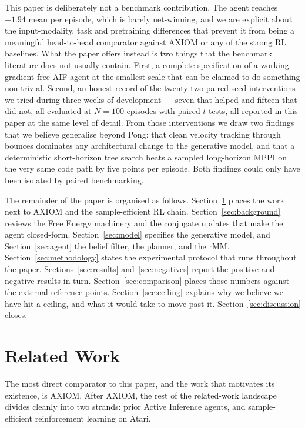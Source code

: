 \documentclass[runningheads]{llncs}
\begin{document}
This paper is deliberately not a benchmark contribution. The agent
reaches $+1.94$ mean per episode, which is barely net-winning, and
we are explicit about the input-modality, task and pretraining
differences that prevent it from being a meaningful head-to-head
comparator against AXIOM or any of the strong RL baselines. What
the paper offers instead is two things that the benchmark
literature does not usually contain. First, a complete
specification of a working gradient-free AIF agent at the smallest
scale that can be claimed to do something non-trivial. Second, an
honest record of the twenty-two paired-seed interventions we tried
during three weeks of development --- seven that helped and fifteen
that did not, all evaluated at $N{=}100$ episodes with paired
$t$-tests, all reported in this paper at the same level of detail.
From those interventions we draw two findings that we believe
generalise beyond Pong: that clean velocity tracking through bounces
dominates any architectural change to the generative model, and
that a deterministic short-horizon tree search beats a sampled
long-horizon MPPI on the very same code path by five points per
episode. Both findings could only have been isolated by paired
benchmarking.

The remainder of the paper is organised as follows.
Section~\ref{sec:related} places the work next to AXIOM and the
sample-efficient RL chain. Section~\ref{sec:background} reviews the
Free Energy machinery and the conjugate updates that make the agent
closed-form. Section~\ref{sec:model} specifies the generative
model, and Section~\ref{sec:agent} the belief filter, the planner,
and the rMM. Section~\ref{sec:methodology} states the experimental
protocol that runs throughout the paper. Sections~\ref{sec:results}
and~\ref{sec:negatives} report the positive and negative results in
turn. Section~\ref{sec:comparison} places those numbers against the
external reference points. Section~\ref{sec:ceiling} explains why
we believe we have hit a ceiling, and what it would take to move
past it. Section~\ref{sec:discussion} closes.

\section{Related Work}\label{sec:related}

The most direct comparator to this paper, and the work that motivates
its existence, is AXIOM. After AXIOM, the rest of the related-work
landscape divides cleanly into two strands: prior Active Inference
agents, and sample-efficient reinforcement learning on Atari.
\end{document}
